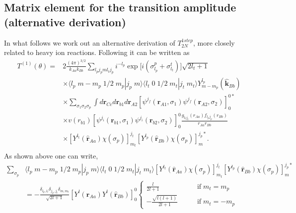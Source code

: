 \subsection{Matrix element for the transition amplitude (alternative derivation)}
In what follows we work out an alternative derivation of $T^{1step}_{2N}$, more closely related to heavy ion reactions. Following \cite{Bayman:82} it can be written as
\begin{equation}\label{eq141}
 \begin{split}
T^{(1)}(\theta)=&2\frac{(4\pi)^{3/2}}{k_{Aa}k_{Bb}}\sum_{l_pj_pml_tj_p}i^{-l_p}
\exp\bigl[i(\sigma_{l_p}^p+\sigma_{l_t}^t)\bigr] \sqrt{2l_t+1}\\
&\times \langle l_p \;m-m_p\;1/2\;m_p|j_p\;m\rangle\langle l_t \;0\;1/2\;m_t|j_t\;m_t\rangle Y_{m-m_p}^{l_p}(\hat{\mathbf{k}}_{Bb})\\
 &\times \sum_{\sigma_1 \sigma_2 \sigma_p}\int d\mathbf{r}_{Cc}d\mathbf{r}_{b1}d\mathbf{r}_{A2}\left[ \psi ^{j_f} (\mathbf{r}_{A1},\sigma_1) \psi ^{j_f} (\mathbf{r}_{A2},\sigma_2) \right] _0^{0*}\\
 &\times  v(r_{b1})
\left[ \psi ^{j_i} (\mathbf{r}_{b1},\sigma_1) \psi ^{j_i} (\mathbf{r}_{b2},\sigma_2) \right] _0^{0} \frac{g_{l_tj_t}(r_{Aa})f_{l_pj_p}(r_{Bb})}{r_{Aa}r_{Bb}}\\
 &\times \left[Y^{l_t}(\hat{\mathbf{r}}_{Aa})\chi(\sigma_p)\right]^{j_t}_{m_t}\left[Y^{l_p}
    (\hat{\mathbf{r}}_{Bb})\chi(\sigma_p)\right]^{j_p*}_{m}.\\
 \end{split}
\end{equation}
As shown above one can write,
\begin{equation}\label{eq142}
 \begin{split}
\sum_{\sigma_p}& \langle l_p \;m-m_p\;1/2\;m_p|j_p\;m\rangle\langle l_t \;0\;1/2\;m_t|j_t\;m_t\rangle \left[Y^{l_t}(\hat{\mathbf{r}}_{Aa})\chi(\sigma_p)\right]^{j_t}_{m_t}\left[Y^{l_p}
    (\hat{\mathbf{r}}_{Bb})\chi(\sigma_p)\right]^{j_p*}_{m}\\
    &=-\frac{\delta_{l_p,l_t}\delta_{j_p,j_t}\delta_{m,m_t}}{\sqrt{2l+1}}
    \left[Y^{l}(\hat{\mathbf{r}}_{Aa})Y^{l}(\hat{\mathbf{r}}_{Bb})\right]^{0}_{0}
    \left\{
\begin{aligned}
\frac{l}{2l+1} \qquad &\text{if}\; m_t=m_p\\
-\frac{\sqrt{l(l+1)}}{2l+1}\qquad &\text{if} \;m_t=-m_p
\end{aligned}
\right.
 \end{split}
\end{equation}
